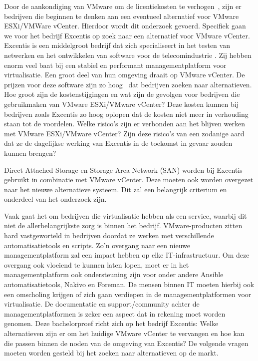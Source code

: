 Door de aankondiging van VMware om de licentiekosten te verhogen~\autocite{device42_2024}, zijn er bedrijven die beginnen te denken aan een eventueel alternatief voor VMware ESXi/VMWare vCenter.
Hierdoor wordt dit onderzoek gevoerd. Specifiek gaan we voor het bedrijf Excentis op zoek naar een alternatief voor VMware vCenter.
Excentis is een middelgroot bedrijf dat zich specialiseert in het testen van netwerken en het ontwikkelen van software voor de telecomindustrie \autocite{excentis2025}.
Zij hebben enorm veel baat bij een stabiel en performant managementplatform voor virtualisatie. Een groot deel van hun omgeving draait op VMware vCenter.
De prijzen voor deze software zijn zo hoog~\autocite{Hale2024} dat bedrijven zoeken naar alternatieven.
Hoe groot zijn de kostenstijgingen en wat zijn de gevolgen voor bedrijven die gebruikmaken van VMware ESXi/VMware vCenter?
Deze kosten kunnen bij bedrijven zoals Excentis zo hoog oplopen dat de kosten niet meer in verhouding staan tot de voordelen.
Welke risico's zijn er verbonden aan het blijven werken met VMware ESXi/VMware vCenter?
Zijn deze risico’s van een zodanige aard dat ze de dagelijkse werking van Excentis in de toekomst in gevaar zouden kunnen brengen?

Direct Attached Storage en Storage Area Network (SAN) worden bij Excentis gebruikt in combinatie met VMware vCenter.
Deze moeten ook worden overgezet naar het nieuwe alternatieve systeem. Dit zal een belangrijk criterium en onderdeel van het onderzoek zijn.

Vaak gaat het om bedrijven die virtualisatie hebben als een service, waarbij dit niet de allerbelangrijkste zorg is binnen het bedrijf.
VMware-producten zitten hard vastgeworteld in bedrijven doordat ze werken met verschillende automatisatietools en scripts. Zo'n overgang naar een nieuwe managementplatform zal een impact hebben op elke IT-infrastructuur.
Om deze overgang ook vloeiend te kunnen laten lopen, moet er in het managementplatform ook ondersteuning zijn voor onder andere Ansible automatisatietools, Nakivo en Foreman.
De mensen binnen IT moeten hierbij ook een omscholing krijgen of zich gaan verdiepen in de managementplatformen  voor virtualisatie. De documentatie en support/community achter de managementplatformen is zeker een aspect dat in rekening moet worden genomen.
Deze bachelorproef richt zich op het bedrijf Excentis: Welke alternatieven zijn er om het huidige VMware vCenter te vervangen en hoe kan die passen binnen de noden van de omgeving van Excentis?
De volgende vragen moeten worden gesteld bij het zoeken naar alternatieven op de markt.



